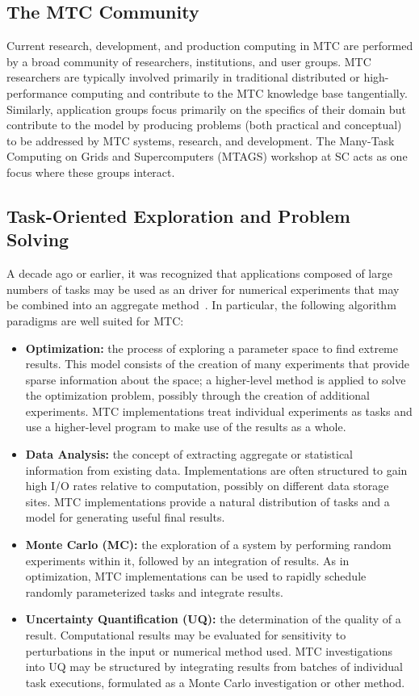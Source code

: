 \documentclass[10pt,letterpaper]{article}
\begin{document}
\subsection{The MTC Community}

Current research, development, and production computing in MTC are
performed by a broad community of researchers, institutions, and user
groups.  MTC researchers are typically involved primarily in
traditional distributed or high-performance computing and contribute
to the MTC knowledge base tangentially.  Similarly, application groups
focus primarily on the specifics of their domain but contribute to the
model by producing problems (both practical and conceptual) to be
addressed by MTC systems, research, and development.  The
Many-Task Computing on Grids and Supercomputers (MTAGS) workshop
at SC acts as one focus where these groups interact.

\subsection{Task-Oriented Exploration and Problem Solving}

A decade ago or earlier, it was recognized that applications composed
of large numbers of tasks may be used as an driver for numerical
experiments that may be combined into an aggregate
method~\cite{Nimrod_G_2000}.  In particular, the following algorithm
paradigms are well suited for MTC:

\begin{itemize}
\item {\bf Optimization:} the process of exploring a parameter space
  to find extreme results.  This model consists of the creation of
  many experiments that provide sparse information about the space; a
  higher-level method is applied to solve the optimization problem,
  possibly through the creation of additional experiments.  MTC
  implementations treat individual experiments as tasks and use a
  higher-level program to make use of the results as a whole.
\item {\bf Data Analysis:} the concept of extracting aggregate or
  statistical information from existing data.  Implementations are
  often structured to gain high I/O rates relative to computation,
  possibly on different data storage sites.  MTC implementations
  provide a natural distribution of tasks and a model for generating
  useful final results.
\item {\bf Monte Carlo (MC):} the exploration of a system by
  performing random experiments within it, followed by an integration
  of results.  As in optimization, MTC implementations can be used to
  rapidly schedule randomly parameterized tasks and integrate results.
\item {\bf Uncertainty Quantification (UQ):} the determination of the
  quality of a result.  Computational results may be evaluated
  for sensitivity to perturbations in the input or numerical method
  used.  MTC investigations into UQ may be structured by integrating
  results from batches of individual task executions, formulated as
  a Monte Carlo investigation or other method.
\end{itemize}
\end{document}
